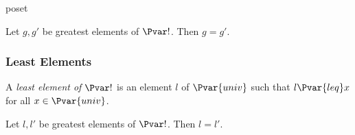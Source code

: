 \documentclass{stex}
\begin{document}
\begin{smodule}{poset}
\begin{forthel}
    \begin{proposition*}
      Let $g, g'$ be greatest elements of $\Pvar!$.
      Then $g = g'$.
    \end{proposition*}
  \end{forthel}

  \subsubsection{Least Elements}

  \begin{forthel}
    \begin{definition*}
      A \emph{least element of $\Pvar!$} is an element $l$ of $\Pvar{univ}$ such that $l {\Pvar{leq}} x$ for all $x \in \Pvar{univ}$.
    \end{definition*}

    \begin{proposition*}
      Let $l, l'$ be greatest elements of $\Pvar!$.
      Then $l = l'$.
    \end{proposition*}
  \end{forthel}
\end{smodule}
\end{document}
